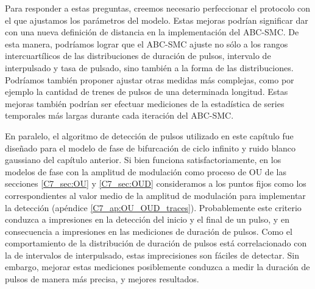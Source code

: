 \documentclass[./main.tex]{subfiles}
\begin{document}
Para responder a estas preguntas, creemos necesario perfeccionar el protocolo con el que ajustamos los parámetros del modelo. Estas mejoras podrían significar dar con una nueva definición de distancia en la implementación del ABC-SMC. De esta manera, podríamos lograr que el ABC-SMC ajuste no sólo a los rangos intercuartílicos de las distribuciones de duración de pulsos, intervalo de interpulsado y tasa de pulsado, sino también a la forma de las distribuciones. Podríamos también proponer ajustar otras medidas más complejas, como por ejemplo la cantidad de trenes de pulsos de una determinada longitud. Estas mejoras también podrían ser efectuar mediciones de la estadística de series temporales más largas durante cada iteración del ABC-SMC. 

En paralelo, el algoritmo de detección de pulsos utilizado en este capítulo fue diseñado para el modelo de fase de bifurcación de ciclo infinito y ruido blanco gaussiano del capítulo anterior. Si bien funciona satisfactoriamente, en los modelos de fase con la amplitud de modulación como proceso de OU de las secciones \ref{C7_sec:OU} y \ref{C7_sec:OUD} consideramos a los puntos fijos como los correspondientes al valor medio de la amplitud de modulación para implementar la detección (apéndice \ref{C7_ap:OU_OUD_traces}). Probablemente este criterio conduzca a impresiones en la detección del inicio y el final de un pulso, y en consecuencia a impresiones en las mediciones de duración de pulsos. Como el comportamiento de la distribución de duración de pulsos está correlacionado con la de intervalos de interpulsado, estas imprecisiones son fáciles de detectar. Sin embargo, mejorar estas mediciones posiblemente conduzca a medir la duración de pulsos de manera más precisa, y mejores resultados. 
\end{document}
